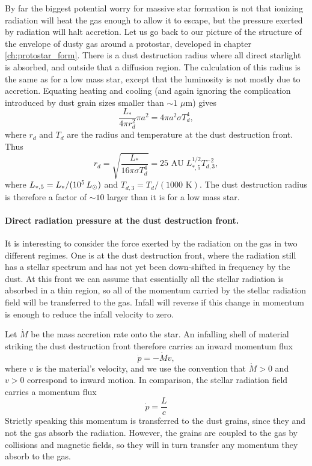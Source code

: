 By far the biggest potential worry for massive star formation is not that ionizing radiation will heat the gas enough to allow it to escape, but the pressure exerted by radiation will halt accretion. Let us go back to our picture of the structure of the envelope of dusty gas around a protostar, developed in chapter \ref{ch:protostar_form}. There is a dust destruction radius where all direct starlight is absorbed, and outside that a diffusion region. The calculation of this radius is the same as for a low mass star, except that the luminosity is not mostly due to accretion. Equating heating and cooling (and again ignoring the complication introduced by dust grain sizes smaller than $\sim 1$ $\mu$m) gives
\begin{equation}
\frac{L_*}{4\pi r_d^2} \pi a^2 = 4\pi a^2 \sigma T_d^4,
\end{equation}
where $r_d$ and $T_d$ are the radius and temperature at the dust destruction front. Thus
\begin{equation}
r_d = \sqrt{\frac{L_*}{16 \pi \sigma T_d^4}} = 25\mbox{ AU}\; L_{*,5}^{1/2} T_{d,3}^{-2},
\end{equation}
where $L_{*,5} = L_*/(10^5\,L_{\odot})$ and $T_{d,3}=T_d/(1000\mbox{ K})$. The dust destruction radius is therefore a factor of $\sim 10$ larger than it is for a low mass star.

\paragraph{Direct radiation pressure at the dust destruction front.} It is interesting to consider the force exerted by the radiation on the gas in two different regimes. One is at the dust destruction front, where the radiation still has a stellar spectrum and has not yet been down-shifted in frequency by the dust. At this front we can assume that essentially all the stellar radiation is absorbed in a thin region, so all of the momentum carried by the stellar radiation field will be transferred to the gas. Infall will reverse if this change in momentum is enough to reduce the infall velocity to zero.

Let $\dot{M}$ be the mass accretion rate onto the star. An infalling shell of material striking the dust destruction front therefore carries an inward momentum flux
\begin{equation}
\dot{p} = -\dot{M} v,
\end{equation}
where $v$ is the material's velocity, and we use the convention that $\dot{M}>0$ and $v>0$ correspond to inward motion. In comparison, the stellar radiation field carries a momentum flux
\begin{equation}
\dot{p} = \frac{L}{c}
\end{equation}
Strictly speaking this momentum is transferred to the dust grains, since they and not the gas absorb the radiation. However, the grains are coupled to the gas by collisions and magnetic fields, so they will in turn transfer any momentum they absorb to the gas.

